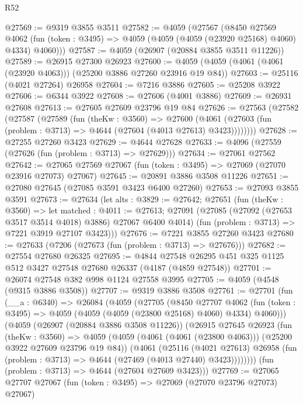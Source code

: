 \begin{lexlean}{R52}
\begin{coremodule}
@27569 := @9319 @3855 @3511
@27582 := @4059
    (@27567
      (@8450
        @27569
        @4062
        (fun (token : @3495) => @4059 (@4059 (@4059 (@23920 @25168) @4060) @4334) @4060)))
@27587 := @4059 (@26907 (@20884 @3855 @3511 @11226))
@27589 := @26915 @27300 @26923
@27600 := @4059 (@4059 (@4061 (@4061 (@23920 @4063))) (@25200 @3886 @27260 @23916 @19 @84))
@27603 := @25116 (@4021 @27264) @26958
@27604 := @7216 @3886
@27605 := @25208 @3922
@27606 := @6344 @3922
@27608 := @27606 (@4001 @3886)
@27609 := @26931 @27608
@27613 := @27605 @27609 @23796 @19 @84
@27626 := @27563
    (@27582
      (@27587
        (@27589
          (fun (theKw : @3560) =>
          @27600 (@4061 (@27603 (fun (problem : @3713) => @4644 (@27604 (@4013 @27613) @3423))))))))
@27628 := @27255 @27260 @3423
@27629 := @4644 @27628
@27633 := @4096 (@27559 (@27626 (fun (problem : @3713) => @27629)))
@27634 := @27061 @27562
@27642 := @27065 @27569 @27067 (fun (token : @3495) => @27069 (@27070 @23916 @27073) @27067)
@27645 := @20891 @3886 @3508 @11226
@27651 := @27080 @27645 (@27085 @3591 @3423 @6400 @27260)
@27653 := @27093 @3855 @3591
@27673 := @27634
    (let alts : @3829 := @27642;
    @27651
      (fun (theKw : @3560) =>
      let matched : @4011 := @27613;
      @27091
        (@27085 (@27092 (@27653 @3517 @3514 @4018) @3886) @27067 @6400 @4014)
        (fun (problem : @3713) => @7221 @3919 @27107 @3423)))
@27676 := @7221 @3855 @27260 @3423
@27680 := @27633 (@7206 (@27673 (fun (problem : @3713) => @27676)))
@27682 := @27554 @27680 @26325
@27695 := @4844 @27548 @26295 @451 @325 @1125 @512 @3427 @27548 @27680 @26337 (@4187 (@4859 @27548))
@27701 := @26074 @27548 @382 @998 @1124 @27558 @3995
@27705 := @4059 (@4548 (@9315 @3886 @3508))
@27707 := @9319 @3886 @3508
@27761 := @27701
    (fun (__a : @6340) =>
    @26084
      (@4059
        (@27705
          (@8450
            @27707
            @4062
            (fun (token : @3495) => @4059 (@4059 (@4059 (@23800 @25168) @4060) @4334) @4060)))
        (@4059
          (@26907 (@20884 @3886 @3508 @11226))
          (@26915
            @27645
            @26923
            (fun (theKw : @3560) =>
            @4059
              (@4059 (@4061 (@4061 (@23800 @4063))) (@25200 @3922 @27609 @23796 @19 @84))
              (@4061
                (@25116
                  (@4021 @27613)
                  @26958
                  (fun (problem : @3713) => @4644 (@27469 (@4013 @27440) @3423))))))))
      (fun (problem : @3713) => @4644 (@27604 @27609 @3423)))
@27769 := @27065 @27707 @27067 (fun (token : @3495) => @27069 (@27070 @23796 @27073) @27067)

\end{coremodule}
\end{lexlean}
